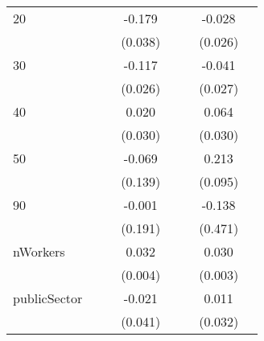 {\begin{longtable}{l*{3}{c}|l*{3}{c}}
		20                  &                     &                     &      -0.179\sym{***}&                     &                     &      -0.028         \\
		&                     &                     &     (0.038)         &                     &                     &     (0.026)         \\
		30                  &                     &                     &      -0.117\sym{***}&                     &                     &      -0.041         \\
		&                     &                     &     (0.026)         &                     &                     &     (0.027)         \\
		40                  &                     &                     &       0.020         &                     &                     &       0.064\sym{*}  \\
		&                     &                     &     (0.030)         &                     &                     &     (0.030)         \\
		50                  &                     &                     &      -0.069         &                     &                     &       0.213\sym{*}  \\
		&                     &                     &     (0.139)         &                     &                     &     (0.095)         \\
		90                  &                     &                     &      -0.001         &                     &                     &      -0.138         \\
		&                     &                     &     (0.191)         &                     &                     &     (0.471)         \\
		nWorkers            &                     &                     &       0.032\sym{***}&                     &                     &       0.030\sym{***}\\
		&                     &                     &     (0.004)         &                     &                     &     (0.003)         \\
		publicSector      &                     &                     &      -0.021         &                     &                     &       0.011         \\
		&                     &                     &     (0.041)         &                     &                     &     (0.032)         \\

\end{longtable}}
